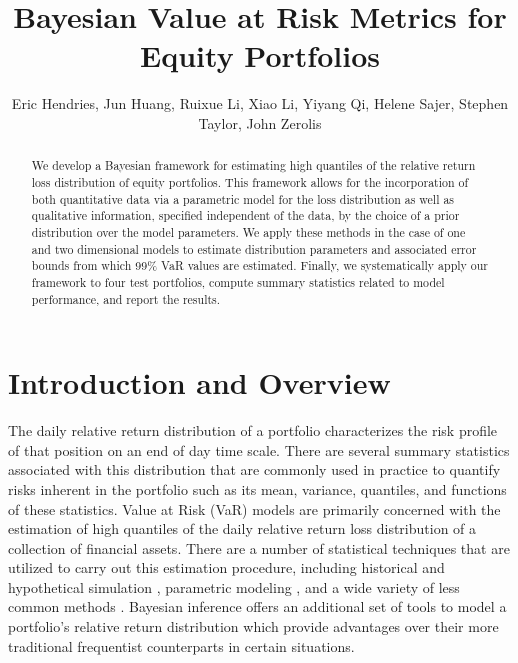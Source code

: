 \documentclass{amsart}
\title{Bayesian Value at Risk Metrics for Equity Portfolios}
\author{Eric Hendries, Jun Huang, Ruixue Li, Xiao Li, Yiyang Qi, Helene Sajer, Stephen Taylor, John 
Zerolis}
\begin{document}
\maketitle


\begin{abstract}
We develop a Bayesian framework for estimating high quantiles of the relative return loss 
distribution of equity portfolios.  This framework allows for the incorporation of both 
quantitative data via a parametric model for the loss distribution as well as 
qualitative information, specified independent of the data, by the choice 
of a prior distribution over the model parameters. We apply these methods in the case of 
one and two dimensional models to estimate distribution parameters and associated error 
bounds from which 99\% VaR values are estimated.
Finally, we systematically apply our framework to four test portfolios, compute 
summary statistics related to model performance, and report the results.
\end{abstract}

\tableofcontents

\section{Introduction and Overview}


The daily relative return distribution of a portfolio characterizes the
risk profile of that position on an end of day time scale.  There are several summary statistics 
associated with this distribution that are commonly used in practice
to quantify risks inherent in the portfolio such as its mean,  
variance, quantiles, and functions of these statistics.  
Value at Risk (VaR) models are primarily concerned with the estimation of
high quantiles of the daily relative return loss distribution of a collection of financial assets.  
There are a number of statistical techniques that are utilized to
carry out this estimation procedure, including historical \cite{Barone-Adesi-99,Pritsker-06}
and hypothetical simulation \cite{Berkowitz-99}, 
parametric modeling \cite{McNeil-05,Meucci-05}, 
and a wide variety of less common methods 
\cite{Butler-98,Chen-05,Hendricks-99,Longin-00,McNeil-00,Scaillet-04}.  
Bayesian inference offers an additional set of tools to model a portfolio's relative 
return distribution which provide advantages over their more traditional
frequentist counterparts in certain situations.
\end{document}
